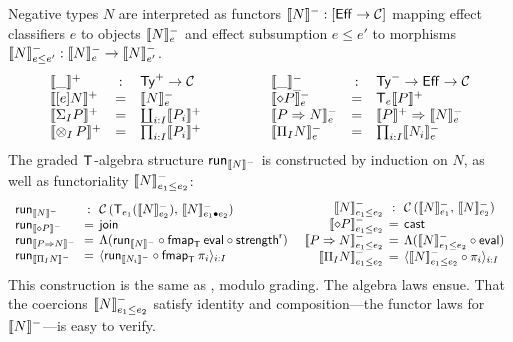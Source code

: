\documentclass[acmsmall,review,anonymous]{acmart}\settopmatter{printfolios=true,printccs=false,printacmref=false}
\theoremstyle{remark}
\begin{document}
Negative types $N$ are interpreted
as functors
$\denn N : [\Eff \to \CC]$
mapping
effect classifiers $e$ to objects $\Denn N e$ and effect subsumption $e
\leq e'$ to morphisms $\Denn N {e \leq e'} : \Denn N e \to \Denn N {e'}$.
\[
\begin{array}{lcl}
  \denp\_ & : & \PTy \to \CC \\
  \denp{\thunkty e N} & = & \Denn N e \\
  \denp{\sumt I P} & = & \coprod_{i:I} \denp{P_i} \\
  \denp{\tupt I P} & = & \prod_{i:I} \denp{P_i} \\
\end{array}
\qquad\qquad
\begin{array}{lcl}
  \Denn\_\_ & : & \NTy \to \Eff \to \CC \\
  \Denn{\diamond P} e & = & \T[e] \denp P \\
  \Denn{P \To N}   e & = & \denp P \To \Denn N e \\
  \Denn{\rect I N} e & = & \prod_{i:I} \Denn{N_i}e \\
\end{array}
\]
The graded $\T$-algebra structure $\run[\denn N]$ is constructed by
induction on $N$, as well as functoriality $\Denn N {e_1 \leq e_2}$:
\[
\begin{array}{l@{~~}c@{\hspace{1ex}}l}
  \run[\denn N] & : & \Hom {\T[e_1](\Denn N {e_2})} {\Denn N {e_1 \bu e_2}} \\
  \run[\denn {\diamond P}] & = & \tjoin \\
  \run[\denn {P \To N}]   & = & \Lambda(\run[\denn N] \circ
                                \fmap[\T]\teval \circ \strengthr) \\
  \run[\denn {\rect I N}] & = & \langle \run[\denn{N_i}] \comp
                                \fmap[\T]{\pi_i} \rangle_{i:I} \\
\end{array}
\
\begin{array}{r@{\hspace{1ex}}c@{\hspace{1ex}}l}
  \Denn N {e_1 \leq e_2} & : & \Hom {\Denn N {e_1}} {\Denn N {e_2}} \\
  \Denn {\diamond P} {e_1 \leq e_2} & = & \tcast \\
  \Denn {P \To N}   {e_1 \leq e_2} & = &
    \Lambda(\Denn N {e_1 \leq e_2} \comp \teval) \\
  \Denn {\rect I N} {e_1 \leq e_2} & = &
    \langle \Denn N {e_1 \leq e_2} \comp \pi_i {} \rangle_{i:I} \\
\end{array}
\]
This construction is the same as \citet{levy:hosc06}, modulo grading.
The algebra laws ensue.
That the coercions $\Denn N {e_1 \leq e_2}$
satisfy identity and composition---the functor
laws for $\denn N$---is easy to verify.
\end{document}

